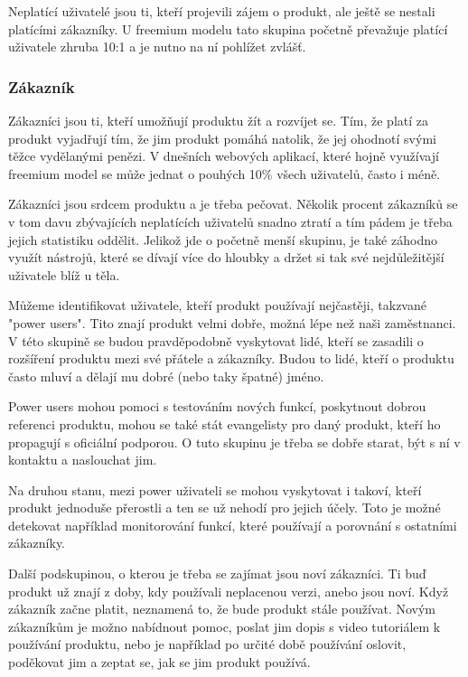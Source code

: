 \documentclass[bc,female,java,dept456]{diploma}						%
\begin{document}
Neplatící uživatelé jsou ti, kteří projevili zájem o produkt, ale ještě se nestali platícími zákazníky. U freemium modelu tato skupina početně převažuje platící uživatele zhruba 10:1 a je nutno na ní pohlížet zvlášť.

\subsubsection{Zákazník}

Zákazníci jsou ti, kteří umožňují produktu žít a rozvíjet se. Tím, že platí za produkt vyjadřují tím, že jim produkt pomáhá natolik, že jej ohodnotí svými těžce vydělanými penězi. V dnešních webových aplikací, které hojně využívají freemium model se může jednat o pouhých 10\% všech uživatelů, často i méně. 

Zákazníci jsou srdcem produktu a je třeba pečovat. Několik procent zákazníků se v tom davu zbývajících neplatících uživatelů snadno ztratí a tím pádem je třeba jejich statistiku oddělit. Jelikož jde o početně menší skupinu, je také záhodno využít nástrojů, které se dívají více do hloubky a držet si tak své nejdůležitější uživatele blíž u těla. 

Můžeme identifikovat uživatele, kteří produkt používají nejčastěji, takzvané "power users". Tito znají produkt velmi dobře, možná lépe než naši zaměstnanci. V této skupině se budou pravděpodobně vyskytovat lidé, kteří se zasadili o rozšíření produktu mezi své přátele a zákazníky. Budou to lidé, kteří o produktu často mluví a dělají mu dobré (nebo taky špatné) jméno.

Power users mohou pomoci s testováním nových funkcí, poskytnout dobrou referenci produktu, mohou se také stát evangelisty pro daný produkt, kteří ho propagují s oficiální podporou. O tuto skupinu je třeba se dobře starat, být s ní v kontaktu a naslouchat jim. 

Na druhou stanu, mezi power uživateli se mohou vyskytovat i takoví, kteří produkt jednoduše přerostli a ten se už nehodí pro jejich účely. Toto je možné detekovat například monitorování funkcí, které používají a porovnání s ostatními zákazníky.

Další podskupinou, o kterou je třeba se zajímat jsou noví zákazníci. Ti buď produkt už znají z doby, kdy používali neplacenou verzi, anebo jsou noví. Když zákazník začne platit, neznamená to, že bude produkt stále používat. Novým zákazníkům je možno nabídnout pomoc, poslat jim dopis s video tutoriálem k používání produktu, nebo je například po určité době používání oslovit, poděkovat jim a zeptat se, jak se jim produkt používá.
\end{document}
